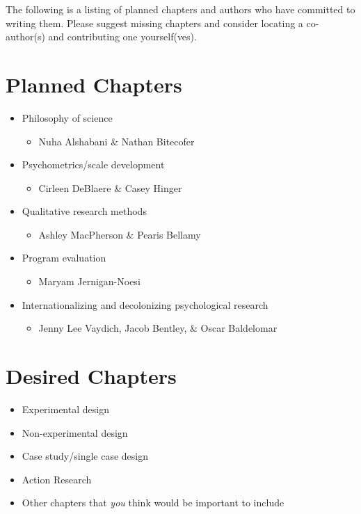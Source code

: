 \documentclass[
  11pt,
]{book}
\providecommand{\tightlist}{%
  \setlength{\itemsep}{0pt}\setlength{\parskip}{0pt}}
\begin{document}
The following is a listing of planned chapters and authors who have committed to writing them. Please suggest missing chapters and consider locating a co-author(s) and contributing one yourself(ves).

\section{Planned Chapters}\label{planned-chapters}

\begin{itemize}
\tightlist
\item
  Philosophy of science

  \begin{itemize}
  \tightlist
  \item
    Nuha Alshabani \& Nathan Bitecofer
  \end{itemize}
\item
  Psychometrics/scale development

  \begin{itemize}
  \tightlist
  \item
    Cirleen DeBlaere \& Casey Hinger
  \end{itemize}
\item
  Qualitative research methods

  \begin{itemize}
  \tightlist
  \item
    Ashley MacPherson \& Pearis Bellamy
  \end{itemize}
\item
  Program evaluation

  \begin{itemize}
  \tightlist
  \item
    Maryam Jernigan-Noesi
  \end{itemize}
\item
  Internationalizing and decolonizing psychological research

  \begin{itemize}
  \tightlist
  \item
    Jenny Lee Vaydich, Jacob Bentley, \& Oscar Baldelomar
  \end{itemize}
\end{itemize}

\section{Desired Chapters}\label{desired-chapters}

\begin{itemize}
\tightlist
\item
  Experimental design
\item
  Non-experimental design
\item
  Case study/single case design
\item
  Action Research
\item
  Other chapters that \emph{you} think would be important to include
\end{itemize}
\end{document}
